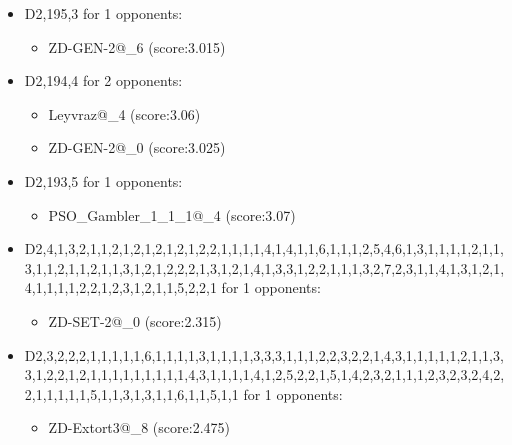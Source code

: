\begin{appendices}
\begin{itemize}
        \item D2,195,3 for 1 opponents:
        \begin{multicols}{3}
            \begin{itemize}
                \item ZD-GEN-2@\_6 (score:3.015)
            \end{itemize}
        \end{multicols}

        \item D2,194,4 for 2 opponents:
        \begin{multicols}{3}
            \begin{itemize}
                \item Leyvraz@\_4 (score:3.06)
                \item ZD-GEN-2@\_0 (score:3.025)
            \end{itemize}
        \end{multicols}

        \item D2,193,5 for 1 opponents:
        \begin{multicols}{3}
            \begin{itemize}
                \item PSO\_Gambler\_1\_1\_1@\_4 (score:3.07)
            \end{itemize}
        \end{multicols}

        \item D2,4,1,3,2,1,1,2,1,2,1,2,1,2,1,2,2,1,1,1,1,4,1,4,1,1,6,1,1,1,2,5,4,6,1,3,1,1,1,1,2,1,1,3,1,1,2,1,1,2,1,1,3,1,2,1,2,2,2,1,3,1,2,1,4,1,3,3,1,2,2,1,1,1,3,2,7,2,3,1,1,4,1,3,1,2,1,4,1,1,1,1,2,2,1,2,3,1,2,1,1,5,2,2,1 for 1 opponents:
        \begin{multicols}{3}
            \begin{itemize}
                \item ZD-SET-2@\_0 (score:2.315)
            \end{itemize}
        \end{multicols}

        \item D2,3,2,2,2,1,1,1,1,1,6,1,1,1,1,3,1,1,1,1,3,3,3,1,1,1,2,2,3,2,2,1,4,3,1,1,1,1,1,2,1,1,3,3,1,2,2,1,2,1,1,1,1,1,1,1,1,1,4,3,1,1,1,1,4,1,2,5,2,2,1,5,1,4,2,3,2,1,1,1,2,3,2,3,2,4,2,2,1,1,1,1,1,5,1,1,3,1,3,1,1,6,1,1,5,1,1 for 1 opponents:
        \begin{multicols}{3}
            \begin{itemize}
                \item ZD-Extort3@\_8 (score:2.475)
            \end{itemize}
        \end{multicols}


\end{itemize}
\end{appendices}
